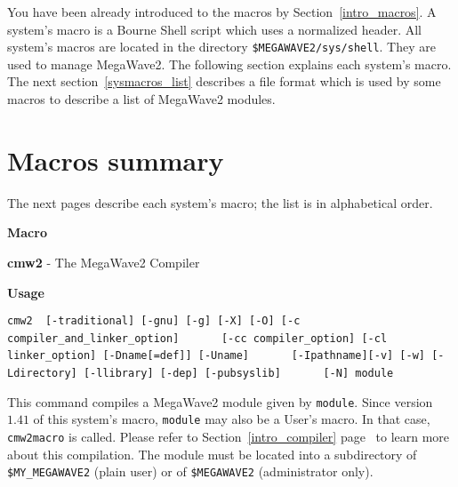 %
%

You have been already introduced to the macros by Section~\ref{intro_macros}.
A system's macro is a Bourne Shell script which uses a normalized header.
All system's macros are located in the directory \verb+$MEGAWAVE2/sys/shell+.
They are used to manage MegaWave2.
The following section explains each system's macro.
The next section~\ref{sysmacros_list} describes a file format which is used
by some macros to describe a list of MegaWave2 modules.

\section{Macros summary}
\label{sysmacros_summary}

The next pages describe each system's macro; the list is
in alphabetical order.

\newcommand{\Macro}[2]{
{\Large\bf  Macro} \bigskip
\index{system's macro!#1}

{\large\bf #1} - #2

\Next}

\newcommand{\Usage}[1]{
{\Large\bf Usage} \bigskip

#1

\Next}

\newcommand{\Options}{
{\Large\bf  Options} \bigskip

}

\newpage

\Macro{cmw2}{The MegaWave2 Compiler}
{\Large\bf Usage} \bigskip

\verb+cmw2  [-traditional] [-gnu] [-g] [-X] [-O] [-c compiler_and_linker_option]+
\newline
\verb+      [-cc compiler_option] [-cl linker_option] [-Dname[=def]] [-Uname]+
\newline
\verb+      [-Ipathname][-v] [-w] [-Ldirectory] [-llibrary] [-dep] [-pubsyslib]+
\newline
\verb+      [-N] module+
\Next

\Description
This command compiles a MegaWave2 module given by \verb+module+.
Since version $1.41$ of this system's macro, \verb+module+ may also be a
User's macro. In that case, \verb+cmw2macro+ is called.
Please refer to Section~\ref{intro_compiler} page~\pageref{intro_compiler}
to learn more about this compilation.
The module must be located into a subdirectory of \verb+$MY_MEGAWAVE2+ (plain user)
or of \verb+$MEGAWAVE2+ (administrator only).

